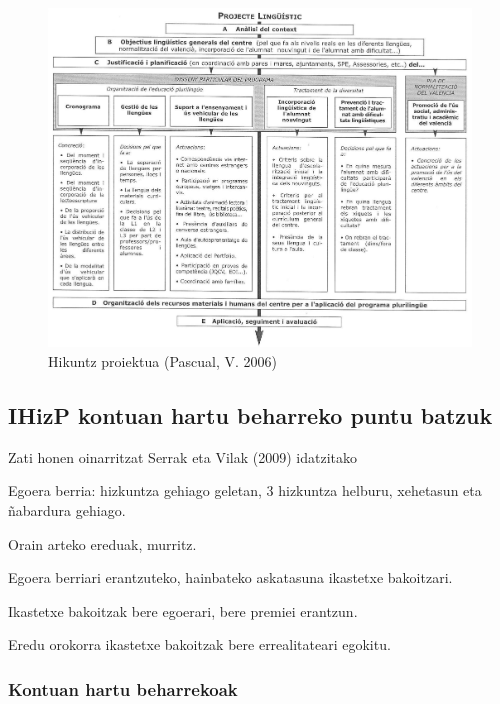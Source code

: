 \documentclass[
]{book}
\begin{document}
\begin{figure}
\centering
\includegraphics{assets/3-img03.jpg}
\caption{Hikuntz proiektua (Pascual, V. 2006)}
\end{figure}

\hypertarget{ihizp-kontuan-hartu-beharreko-puntu-batzuk}{%
\subsection{IHizP kontuan hartu beharreko puntu batzuk}\label{ihizp-kontuan-hartu-beharreko-puntu-batzuk}}

Zati honen oinarritzat Serrak eta Vilak (2009) idatzitako

Egoera berria: hizkuntza gehiago geletan, 3 hizkuntza helburu, xehetasun eta ñabardura gehiago.

Orain arteko ereduak, murritz.

Egoera berriari erantzuteko, hainbateko askatasuna ikastetxe bakoitzari.

Ikastetxe bakoitzak bere egoerari, bere premiei erantzun.

Eredu orokorra ikastetxe bakoitzak bere errealitateari egokitu.

\hypertarget{kontuan-hartu-beharrekoak}{%
\subsubsection*{Kontuan hartu beharrekoak}\label{kontuan-hartu-beharrekoak}}
\end{document}

